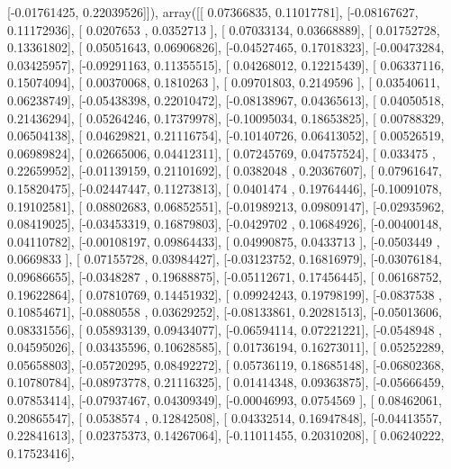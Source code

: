 \documentclass{article}
\begin{document}
       [-0.01761425,  0.22039526]]), array([[ 0.07366835,  0.11017781],
       [-0.08167627,  0.11172936],
       [ 0.0207653 ,  0.0352713 ],
       [ 0.07033134,  0.03668889],
       [ 0.01752728,  0.13361802],
       [ 0.05051643,  0.06906826],
       [-0.04527465,  0.17018323],
       [-0.00473284,  0.03425957],
       [-0.09291163,  0.11355515],
       [ 0.04268012,  0.12215439],
       [ 0.06337116,  0.15074094],
       [ 0.00370068,  0.1810263 ],
       [ 0.09701803,  0.2149596 ],
       [ 0.03540611,  0.06238749],
       [-0.05438398,  0.22010472],
       [-0.08138967,  0.04365613],
       [ 0.04050518,  0.21436294],
       [ 0.05264246,  0.17379978],
       [-0.10095034,  0.18653825],
       [ 0.00788329,  0.06504138],
       [ 0.04629821,  0.21116754],
       [-0.10140726,  0.06413052],
       [ 0.00526519,  0.06989824],
       [ 0.02665006,  0.04412311],
       [ 0.07245769,  0.04757524],
       [ 0.033475  ,  0.22659952],
       [-0.01139159,  0.21101692],
       [ 0.0382048 ,  0.20367607],
       [ 0.07961647,  0.15820475],
       [-0.02447447,  0.11273813],
       [ 0.0401474 ,  0.19764446],
       [-0.10091078,  0.19102581],
       [ 0.08802683,  0.06852551],
       [-0.01989213,  0.09809147],
       [-0.02935962,  0.08419025],
       [-0.03453319,  0.16879803],
       [-0.0429702 ,  0.10684926],
       [-0.00400148,  0.04110782],
       [-0.00108197,  0.09864433],
       [ 0.04990875,  0.0433713 ],
       [-0.0503449 ,  0.0669833 ],
       [ 0.07155728,  0.03984427],
       [-0.03123752,  0.16816979],
       [-0.03076184,  0.09686655],
       [-0.0348287 ,  0.19688875],
       [-0.05112671,  0.17456445],
       [ 0.06168752,  0.19622864],
       [ 0.07810769,  0.14451932],
       [ 0.09924243,  0.19798199],
       [-0.0837538 ,  0.10854671],
       [-0.0880558 ,  0.03629252],
       [-0.08133861,  0.20281513],
       [-0.05013606,  0.08331556],
       [ 0.05893139,  0.09434077],
       [-0.06594114,  0.07221221],
       [-0.0548948 ,  0.04595026],
       [ 0.03435596,  0.10628585],
       [ 0.01736194,  0.16273011],
       [ 0.05252289,  0.05658803],
       [-0.05720295,  0.08492272],
       [ 0.05736119,  0.18685148],
       [-0.06802368,  0.10780784],
       [-0.08973778,  0.21116325],
       [ 0.01414348,  0.09363875],
       [-0.05666459,  0.07853414],
       [-0.07937467,  0.04309349],
       [-0.00046993,  0.0754569 ],
       [ 0.08462061,  0.20865547],
       [ 0.0538574 ,  0.12842508],
       [ 0.04332514,  0.16947848],
       [-0.04413557,  0.22841613],
       [ 0.02375373,  0.14267064],
       [-0.11011455,  0.20310208],
       [ 0.06240222,  0.17523416],
\end{document}
